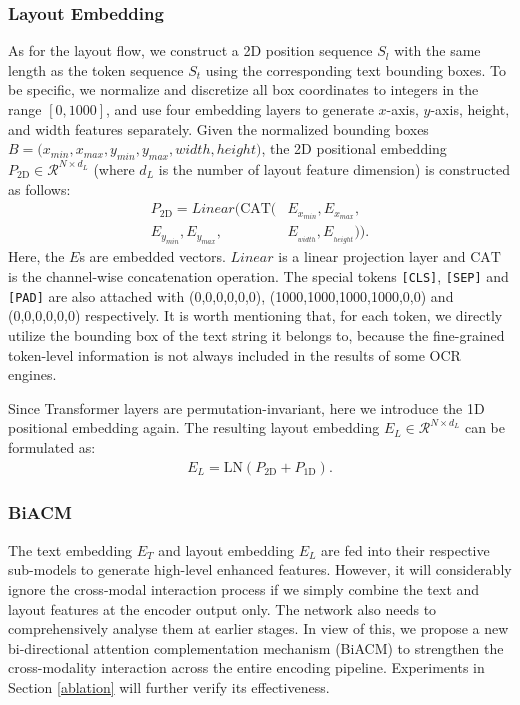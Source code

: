 \documentclass[11pt]{article}
\begin{document}
\subsubsection{Layout  Embedding}
As for the layout flow, we construct a 2D position sequence $S_l$ with the same length as the token sequence $S_t$ using the corresponding text bounding boxes. To be specific,  we normalize and discretize all box coordinates to integers in  the range $[0, 1000]$, and use four embedding layers to generate $x$-axis, $y$-axis, height, and width features separately. Given the normalized bounding boxes $B = \mathrm{(}x_{min}, x_{max}, y_{min}, y_{max}, width, height\mathrm{)}$, the 2D positional embedding $P_{2\mathrm{D}}\in\mathcal{R}^{N\times d_L}$ (where $d_L$ is the number of layout feature dimension) is  constructed  as follows:
\begin{align}
P_{2\mathrm{D}} = Linear(\mathrm{CAT}(&E_{x_{min}}, E_{x_{max}},\nonumber\\ E_{y_{min}}, E_{y_{max}}, &E_{_{width}}, E_{_{height}})). 
\end{align}
Here, the $E$s are embedded vectors. $Linear$ is a linear projection layer and $\mathrm{CAT}$ is the channel-wise concatenation operation. The special tokens \texttt{[CLS]}, \texttt{[SEP]} and \texttt{[PAD]} are  also  attached with (0,0,0,0,0,0), (1000,1000,1000,1000,0,0) and (0,0,0,0,0,0) respectively.
It is worth mentioning that,  for each token, we directly utilize the bounding box of the text string it belongs to, because the fine-grained  token-level information is not always included in the results of some OCR engines.

Since Transformer layers are permutation-invariant, here we introduce the  1D positional embedding again. The resulting layout embedding $E_{L}\in\mathcal{R}^{N\times d_L}$ can be formulated as:
\begin{align}
    E_{L} = \mathrm{LN}(P_{2\mathrm{D}} + P_{1\mathrm{D}}).
\end{align}
\subsubsection{BiACM}
The text embedding $E_T$ and layout embedding $E_L$ are fed into their respective sub-models to generate high-level enhanced features. 
However, it will considerably ignore 
the cross-modal interaction process
if we simply combine the text and layout features at the encoder output only.
The network also needs to comprehensively analyse them at earlier stages. 
In view of this, we propose a new bi-directional attention complementation mechanism (BiACM) to  strengthen the cross-modality interaction across the entire encoding pipeline. Experiments in Section \ref{ablation} will further verify its effectiveness.
\end{document}
